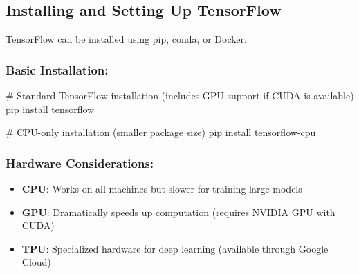 \documentclass[
  letterpaper,
  DIV=11,
  numbers=noendperiod]{scrreprt}
\newenvironment{Shaded}{\begin{snugshade}}{\end{snugshade}}
\newcommand{\CommentTok}[1]{\textcolor[rgb]{0.37,0.37,0.37}{#1}}
\newcommand{\ExtensionTok}[1]{\textcolor[rgb]{0.00,0.23,0.31}{#1}}
\newcommand{\NormalTok}[1]{\textcolor[rgb]{0.00,0.23,0.31}{#1}}
\providecommand{\tightlist}{%
  \setlength{\itemsep}{0pt}\setlength{\parskip}{0pt}}\usepackage{longtable,booktabs,array}
\begin{document}
\subsection{Installing and Setting Up
TensorFlow}\label{installing-and-setting-up-tensorflow}

TensorFlow can be installed using pip, conda, or Docker.

\subsubsection{Basic Installation:}\label{basic-installation}

\begin{Shaded}
\begin{Highlighting}[]
\CommentTok{\# Standard TensorFlow installation (includes GPU support if CUDA is available)}
\ExtensionTok{pip}\NormalTok{ install tensorflow}

\CommentTok{\# CPU{-}only installation (smaller package size)}
\ExtensionTok{pip}\NormalTok{ install tensorflow{-}cpu}
\end{Highlighting}
\end{Shaded}

\subsubsection{Hardware Considerations:}\label{hardware-considerations}

\begin{itemize}
\tightlist
\item
  \textbf{CPU}: Works on all machines but slower for training large
  models
\item
  \textbf{GPU}: Dramatically speeds up computation (requires NVIDIA GPU
  with CUDA)
\item
  \textbf{TPU}: Specialized hardware for deep learning (available
  through Google Cloud)
\end{itemize}
\end{document}

